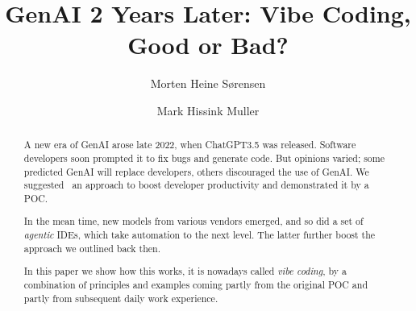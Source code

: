 \documentclass[runningheads]{llncs}
\begin{document}
\title{GenAI 2 Years Later: Vibe Coding, Good or Bad?}
\author{
  Morten Heine Sørensen \and
  Mark Hissink Muller
}
\maketitle
\begin{abstract}
A new era of GenAI arose late 2022, when ChatGPT3.5 was released.
Software developers soon prompted it to fix bugs and generate code.
But opinions varied; some predicted GenAI will replace developers, others discouraged the use of GenAI.
We suggested~\cite{Sorm2023} an approach to boost developer productivity and demonstrated it by a POC.

In the mean time, new models from various vendors emerged, and so did a set of {\em agentic\/} IDEs, which take automation to the next level. 
The latter further boost the approach we outlined back then. 

In this paper we show how this works, it is nowadays called {\em vibe coding\/}, by a combination of principles and examples coming partly from the original POC and partly from subsequent daily work experience.

\end{abstract}
\end{document}
